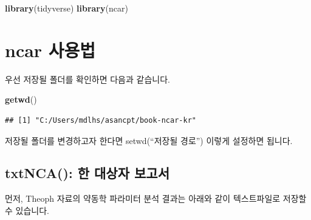 \documentclass[12pt,]{krantz}
\newenvironment{Shaded}{\begin{snugshade}}{\end{snugshade}}
\newcommand{\KeywordTok}[1]{\textcolor[rgb]{0.13,0.29,0.53}{\textbf{#1}}}
\newcommand{\DataTypeTok}[1]{\textcolor[rgb]{0.13,0.29,0.53}{#1}}
\newcommand{\DecValTok}[1]{\textcolor[rgb]{0.00,0.00,0.81}{#1}}
\newcommand{\StringTok}[1]{\textcolor[rgb]{0.31,0.60,0.02}{#1}}
\newcommand{\OperatorTok}[1]{\textcolor[rgb]{0.81,0.36,0.00}{\textbf{#1}}}
\newcommand{\NormalTok}[1]{#1}
\theoremstyle{definition}
\theoremstyle{definition}
\theoremstyle{definition}
\theoremstyle{remark}
\begin{document}
\begin{Shaded}
\begin{Highlighting}[]
\KeywordTok{library}\NormalTok{(tidyverse)}
\KeywordTok{library}\NormalTok{(ncar)}
\end{Highlighting}
\end{Shaded}

\section{ncar 사용법}\label{ncar-}

우선 저장될 폴더를 확인하면 다음과 같습니다.

\begin{Shaded}
\begin{Highlighting}[]
\KeywordTok{getwd}\NormalTok{()}
\end{Highlighting}
\end{Shaded}

\begin{verbatim}
## [1] "C:/Users/mdlhs/asancpt/book-ncar-kr"
\end{verbatim}

저장될 폴더를 변경하고자 한다면 setwd(``저장될 경로'') 이렇게 설정하면
됩니다.

\subsection{txtNCA(): 한 대상자 보고서}\label{txtnca---}

\begin{Shaded}
\end{Shaded}

먼저, Theoph 자료의 약동학 파라미터 분석 결과는 아래와 같이 텍스트파일로
저장할 수 있습니다.
\end{document}
